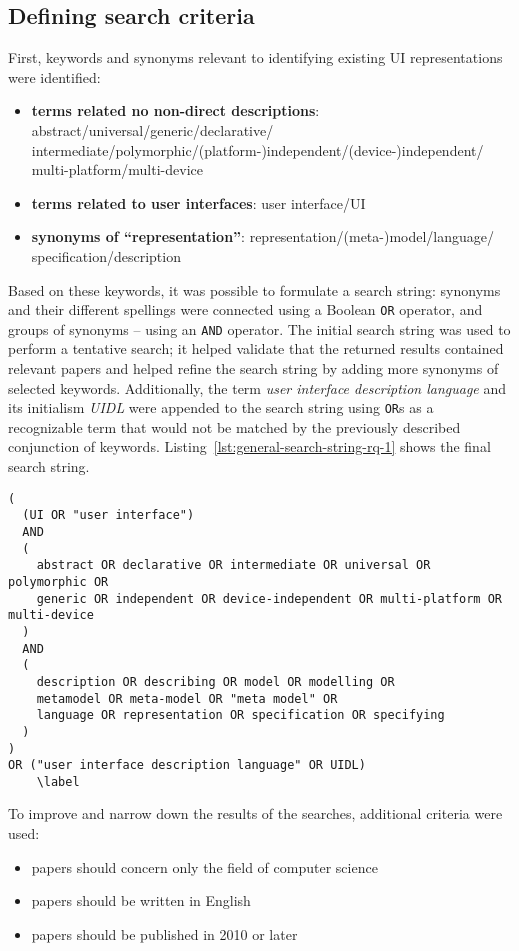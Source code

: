 \subsection{Defining search criteria}\label{subsec:defining-search-criteria}
First, keywords and synonyms relevant to identifying existing UI representations were identified:
\begin{itemize}
    \item \textbf{terms related no non-direct descriptions}: abstract/universal/generic/declarative/\\intermediate/polymorphic/(platform-)independent/(device-)independent/\\multi-platform/multi-device
    \item \textbf{terms related to user interfaces}: user interface/UI
    \item \textbf{synonyms of \enquote{representation}}: representation/(meta-)model/language/\\specification/description
\end{itemize}
Based on these keywords, it was possible to formulate a search string: synonyms and their different spellings were connected using a Boolean \texttt{OR} operator, and groups of synonyms -- using an \texttt{AND} operator.
The initial search string was used to perform a tentative search;
it helped validate that the returned results contained relevant papers and helped refine the search string by adding more synonyms of selected keywords.
Additionally, the term \emph{user interface description language} and its initialism \emph{UIDL} were appended to the search string using \texttt{OR}s as a recognizable term that would not be matched by the previously described conjunction of keywords.
Listing~\ref{lst:general-search-string-rq-1} shows the final search string.
\begin{lstlisting}[label=lst:general-search-string-rq-1,caption=The search string, basicstyle=\ttfamily]
(
  (UI OR "user interface")
  AND
  (
    abstract OR declarative OR intermediate OR universal OR polymorphic OR
    generic OR independent OR device-independent OR multi-platform OR multi-device
  )
  AND
  (
    description OR describing OR model OR modelling OR
    metamodel OR meta-model OR "meta model" OR
    language OR representation OR specification OR specifying
  )
)
OR ("user interface description language" OR UIDL)
    \label
\end{lstlisting}

To improve and narrow down the results of the searches, additional criteria were used:
\begin{samepage}
\begin{itemize}
    \item papers should concern only the field of computer science
    \item papers should be written in English
    \item papers should be published in 2010 or later
\end{itemize}
\end{samepage}


